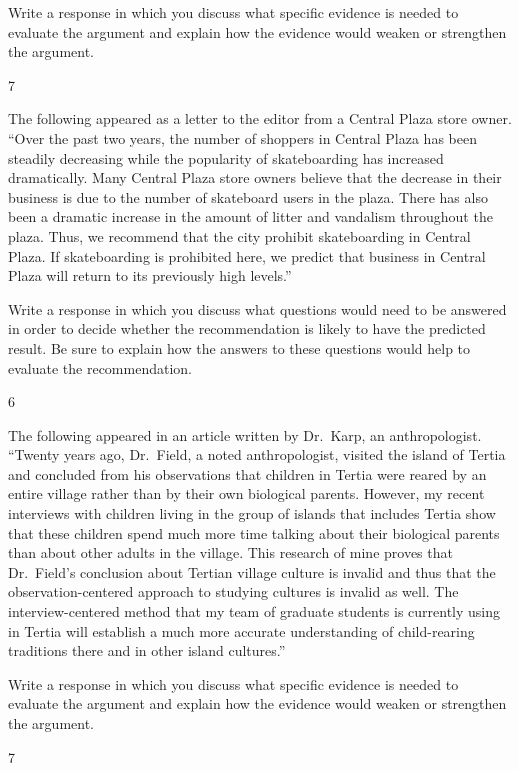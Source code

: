 \documentclass[]{article}
\begin{document}
Write a response in which you discuss what specific evidence is needed
to evaluate the argument and explain how the evidence would weaken or
strengthen the argument.

7

The following appeared as a letter to the editor from a Central Plaza
store owner. ``Over the past two years, the number of shoppers in
Central Plaza has been steadily decreasing while the popularity of
skateboarding has increased dramatically. Many Central Plaza store
owners believe that the decrease in their business is due to the number
of skateboard users in the plaza. There has also been a dramatic
increase in the amount of litter and vandalism throughout the plaza.
Thus, we recommend that the city prohibit skateboarding in Central
Plaza. If skateboarding is prohibited here, we predict that business in
Central Plaza will return to its previously high levels.''

Write a response in which you discuss what questions would need to be
answered in order to decide whether the recommendation is likely to have
the predicted result. Be sure to explain how the answers to these
questions would help to evaluate the recommendation.

6

The following appeared in an article written by Dr.~Karp, an
anthropologist. ``Twenty years ago, Dr.~Field, a noted anthropologist,
visited the island of Tertia and concluded from his observations that
children in Tertia were reared by an entire village rather than by their
own biological parents. However, my recent interviews with children
living in the group of islands that includes Tertia show that these
children spend much more time talking about their biological parents
than about other adults in the village. This research of mine proves
that Dr.~Field's conclusion about Tertian village culture is invalid and
thus that the observation-centered approach to studying cultures is
invalid as well. The interview-centered method that my team of graduate
students is currently using in Tertia will establish a much more
accurate understanding of child-rearing traditions there and in other
island cultures.''

Write a response in which you discuss what specific evidence is needed
to evaluate the argument and explain how the evidence would weaken or
strengthen the argument.

7
\end{document}
